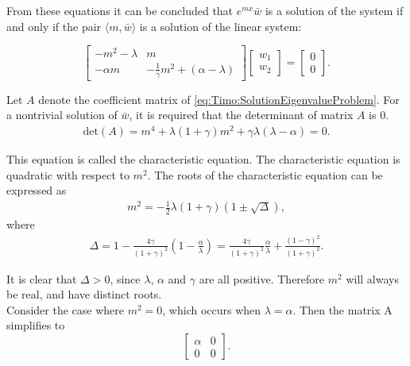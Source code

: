\documentclass[../../main.tex]{subfiles}
\begin{document}
From these equations it can be concluded that $e^{mx}\bar{w}$ is a solution of the system if and only if the pair $\langle m,\bar{w} \rangle$ is a solution of the linear system:

\begin{equation}
\begin{bmatrix}
-m^{2}-\lambda & m\\
-\alpha m & -\frac{1}{\gamma}m^{2}+(\alpha- \lambda)
\end{bmatrix}
\begin{bmatrix}
w_{1}\\w_{2}
\end{bmatrix}
=
\begin{bmatrix}
0\\0
\end{bmatrix}. \label{eq:Timo:SolutionEigenvalueProblem}
\end{equation}

Let $A$ denote the coefficient matrix of \eqref{eq:Timo:SolutionEigenvalueProblem}. For a nontrivial solution of $\bar{w}$, it is required that the determinant of matrix $A$ is $0$.
\begin{align*}
\textrm{det}(A)=m^{4}+\lambda(1+\gamma)m^{2}+\gamma\lambda(\lambda-\alpha)=0. \label{TE7}
\end{align*} \label{sym:determinant}

This equation is called the characteristic equation. The characteristic equation is quadratic with respect to $m^2$. The roots of the characteristic equation can be expressed as
\begin{align}
m^{2}=-\frac{1}{2}\lambda(1+\gamma)(1\pm\sqrt{\Delta}),
\end{align}
where
\begin{align}
\Delta=1-\frac{4\gamma}{(1+\gamma)^{2}}\left(1-\frac{\alpha}{\lambda}\right)=\frac{4\gamma}{(1+\gamma)^{2}}\frac{\alpha}{\lambda}+\frac{(1-\gamma)^{2}}{(1+\gamma)^{2}}.
\end{align}

It is clear that $\Delta>0$, since $\lambda$, $\alpha$ and $\gamma$ are all positive. Therefore $m^{2}$ will always be real, and have distinct roots.\\

Consider the case where $m^{2} = 0$, which occurs when $\lambda = \alpha$. Then the matrix A simplifies to
\begin{equation*}
\begin{bmatrix}
	\alpha & 0\\
	0&0
	\end{bmatrix}.
\end{equation*}
\end{document}
